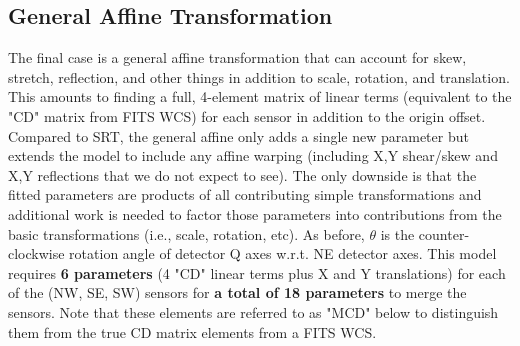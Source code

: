 \documentclass{article}
\begin{document}
\pagebreak

\subsection{General Affine Transformation}

The final case is a general affine transformation that can account for skew,
stretch, reflection, and other things in addition to scale, rotation, and
translation. This amounts to finding a full, 4-element matrix of linear terms
(equivalent to the "CD" matrix from FITS WCS) for each sensor in addition to
the origin offset. Compared to SRT, the general affine only adds a single new
parameter but extends the model to include any affine warping (including X,Y
shear/skew and X,Y reflections that we do not expect to see). The only downside
is that the fitted parameters are products of all contributing simple
transformations and additional work is needed to factor those parameters into
contributions from the basic transformations (i.e., scale, rotation, etc).  As
before, $\theta$ is the counter-clockwise rotation angle of detector Q axes
w.r.t. NE detector axes.  This model requires \textbf{6 parameters} (4 "CD"
linear terms plus X and Y translations) for each of the (NW, SE, SW) sensors
for \textbf{a total of 18 parameters} to merge the sensors. Note that these
elements are referred to as "MCD" below to distinguish them from the true CD
matrix elements from a FITS WCS.
\end{document}
